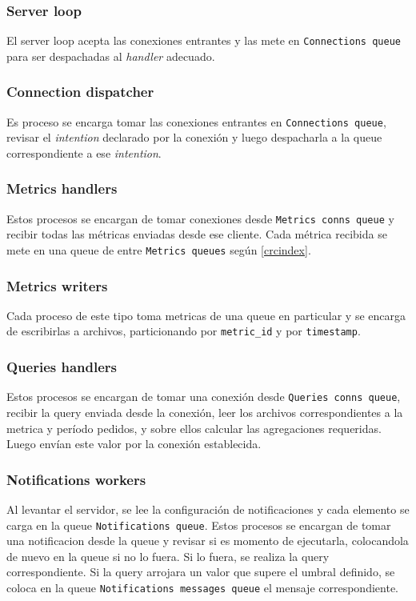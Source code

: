 \documentclass[a4paper,oneside]{article}
\begin{document}
\subsubsection{Server loop}
El server loop acepta las conexiones entrantes y las mete en \texttt{Connections queue} para ser despachadas al \textit{handler} adecuado.

\subsubsection{Connection dispatcher}
Es proceso se encarga tomar las conexiones entrantes en \texttt{Connections queue}, revisar el \textit{intention} declarado por la conexión y luego despacharla a la queue correspondiente a ese \textit{intention}.

\subsubsection{Metrics handlers}
Estos procesos se encargan de tomar conexiones desde \texttt{Metrics conns queue} y recibir todas las métricas enviadas desde ese cliente. Cada métrica recibida se mete en una queue de entre \texttt{Metrics queues} según \eqref{crcindex}.

\subsubsection{Metrics writers}
Cada proceso de este tipo toma metricas de una queue en particular y se encarga de escribirlas a archivos, particionando por \texttt{metric\_id} y por \texttt{timestamp}.

\subsubsection{Queries handlers}
Estos procesos se encargan de tomar una conexión desde \texttt{Queries conns queue}, recibir la query enviada desde la conexión, leer los archivos correspondientes a la metrica y período pedidos, y sobre ellos calcular las agregaciones requeridas. Luego envían este valor por la conexión establecida.

\subsubsection{Notifications workers}
Al levantar el servidor, se lee la configuración de notificaciones y cada elemento se carga en la queue \texttt{Notifications queue}. Estos procesos se encargan de tomar una notificacion desde la queue y revisar si es momento de ejecutarla, colocandola de nuevo en la queue si no lo fuera. Si lo fuera, se realiza la query correspondiente. Si la query arrojara un valor que supere el umbral definido, se coloca en la queue \texttt{Notifications messages queue} el mensaje correspondiente.
\end{document}
